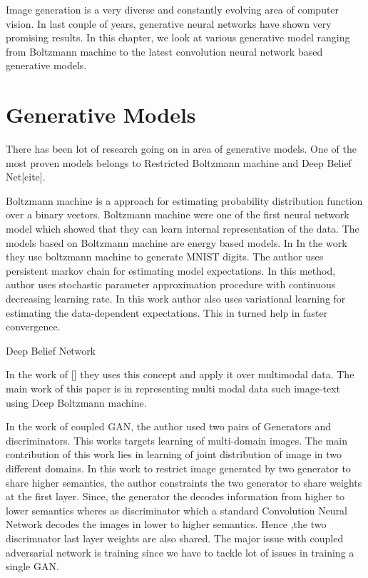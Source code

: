 

\doublespacing


Image generation is a very diverse and constantly evolving area of computer vision. In last couple of years, generative neural networks have shown very promising results. In this chapter, we look at various generative model ranging from Boltzmann machine to the latest convolution neural network based generative models.
\section{Generative Models}

There has been lot of research going on in area of generative models. One of the most proven models belongs to Restricted Boltzmann machine and Deep Belief Net[cite].

Boltzmann machine is a approach for estimating probability distribution function over a binary vectors. Boltzmann machine were one of the first neural network model which showed that they can learn internal representation of the data\cite{Boltzman-Wiki}. The models based on Boltzmann machine are energy based models. In 
In the work they use boltzmann machine to generate MNIST digits. The author uses persistent markov chain for estimating model expectations. In this method, author uses stochastic parameter approximation procedure with continuous decreasing learning rate. In this work author also uses variational learning for estimating the data-dependent expectations. This in turned help in faster convergence.

\par 

Deep Belief Network

In the work of [] they uses this concept and apply it over multimodal data. The main work of this paper is in representing multi modal data such image-text using Deep Boltzmann machine. 

\par
In the work of coupled GAN, the author used two pairs of Generators and discriminators. This works targets learning of multi-domain images. The main contribution of this work lies in learning of joint distribution of image in two different domains. In this work to restrict image generated by two generator to share higher semantics, the author constraints the two generator to share weights at the first layer. Since, the generator the decodes information from higher to lower semantics wheres as discriminator which a standard Convolution Neural Network decodes the images in lower to higher semantics. Hence ,the two discrimnator last layer weights are also shared. The major issue with coupled adversarial network is training since we have to tackle lot of issues in training a single GAN.
\par

